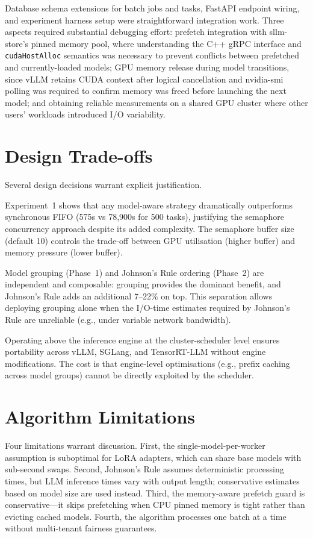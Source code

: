 \documentclass[logo,bsc,singlespacing,parskip,online]{infthesis}
\begin{document}
Database schema extensions for batch jobs and tasks, FastAPI endpoint wiring, and experiment harness setup were straightforward integration work. Three aspects required substantial debugging effort: prefetch integration with sllm-store's pinned memory pool, where understanding the C++ gRPC interface and \texttt{cudaHostAlloc} semantics was necessary to prevent conflicts between prefetched and currently-loaded models; GPU memory release during model transitions, since vLLM retains CUDA context after logical cancellation and nvidia-smi polling was required to confirm memory was freed before launching the next model; and obtaining reliable measurements on a shared GPU cluster where other users' workloads introduced I/O variability.

\section{Design Trade-offs}

Several design decisions warrant explicit justification.

Experiment~1 shows that any model-aware strategy dramatically outperforms synchronous FIFO (575s vs 78,900s for 500 tasks), justifying the semaphore concurrency approach despite its added complexity. The semaphore buffer size (default 10) controls the trade-off between GPU utilisation (higher buffer) and memory pressure (lower buffer).

Model grouping (Phase~1) and Johnson's Rule ordering (Phase~2) are independent and composable: grouping provides the dominant benefit, and Johnson's Rule adds an additional 7--22\% on top. This separation allows deploying grouping alone when the I/O-time estimates required by Johnson's Rule are unreliable (e.g., under variable network bandwidth).

Operating above the inference engine at the cluster-scheduler level ensures portability across vLLM, SGLang, and TensorRT-LLM without engine modifications. The cost is that engine-level optimisations (e.g., prefix caching across model groups) cannot be directly exploited by the scheduler.

\section{Algorithm Limitations}

Four limitations warrant discussion. First, the single-model-per-worker assumption is suboptimal for LoRA adapters, which can share base models with sub-second swaps. Second, Johnson's Rule assumes deterministic processing times, but LLM inference times vary with output length; conservative estimates based on model size are used instead. Third, the memory-aware prefetch guard is conservative---it skips prefetching when CPU pinned memory is tight rather than evicting cached models. Fourth, the algorithm processes one batch at a time without multi-tenant fairness guarantees.
\end{document}
